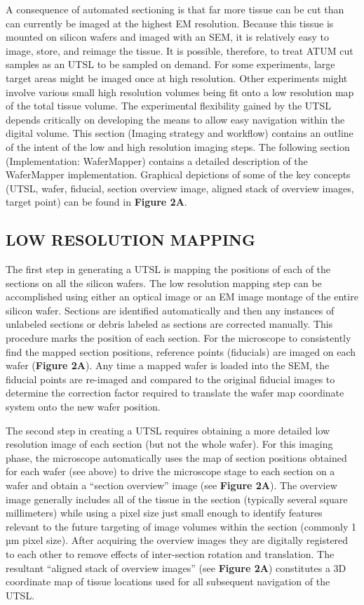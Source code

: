 \documentclass{article}
\begin{document}
A consequence of automated sectioning is that far more tissue can be cut than can currently be imaged at the highest EM resolution. Because this tissue is mounted on silicon wafers and imaged with an SEM, it is relatively easy to image, store, and reimage the tissue. It is possible, therefore, to treat ATUM cut samples as an UTSL to be sampled on demand. For some experiments, large target areas might be imaged once at high resolution. Other experiments might involve various small high resolution volumes being fit onto a low resolution map of the total tissue volume. The experimental flexibility gained by the UTSL depends critically on developing the means to allow easy navigation within the digital volume. This section (Imaging strategy and workflow) contains an outline of the intent of the low and high resolution imaging steps. The following section (Implementation: WaferMapper) contains a detailed description of the WaferMapper implementation. Graphical depictions of some of the key concepts (UTSL, wafer, fiducial, section overview image, aligned stack of overview images, target point) can be found in \textbf{Figure 2A}.

\subsection*{LOW RESOLUTION MAPPING}

The first step in generating a UTSL is mapping the positions of each of the sections on all the silicon wafers. The low resolution mapping step can be accomplished using either an optical image or an EM image montage of the entire silicon wafer. Sections are identified automatically and then any instances of unlabeled sections or debris labeled as sections are corrected manually. This procedure marks the position of each section. For the microscope to consistently find the mapped section positions, reference points (fiducials) are imaged on each wafer (\textbf{Figure 2A}). Any time a mapped wafer is loaded into the SEM, the fiducial points are re-imaged and compared to the original fiducial images to determine the correction factor required to translate the wafer map coordinate system onto the new wafer position.

The second step in creating a UTSL requires obtaining a more detailed low resolution image of each section (but not the whole wafer). For this imaging phase, the microscope automatically uses the map of section positions obtained for each wafer (see above) to drive the microscope stage to each section on a wafer and obtain a “section overview” image (see \textbf{Figure 2A}). The overview image generally includes all of the tissue in the section (typically several square millimeters) while using a pixel size just small enough to identify features relevant to the future targeting of image volumes within the section (commonly 1\,µm pixel size). After acquiring the overview images they are digitally registered to each other to remove effects of inter-section rotation and translation. The resultant “aligned stack of overview images” (see \textbf{Figure 2A}) constitutes a 3D coordinate map of tissue locations used for all subsequent navigation of the UTSL.
\end{document}
